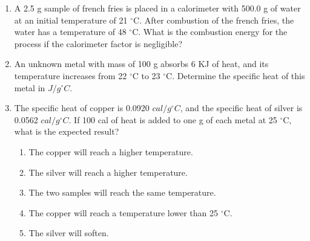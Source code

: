 \documentclass[main.tex]{subfiles}
\begin{document}
\begin{fullwidth}
\begin{multicols*}{2}
\begin{enumerate}
\item  A 2.5 g sample of french fries is placed in a calorimeter with 500.0 g of water at an initial temperature of 21 $^{\circ}$C.  After combustion of the french fries, the water has a temperature of 48 $^{\circ}$C.  What is the combustion energy for the process if the calorimeter factor is negligible?
\begin{enumerate}[label=(\alph*)]\vspace{-0.5cm}
\end{enumerate}\vspace{-0.5cm}

\item  An unknown metal with mass of 100 g absorbs 6 KJ of heat, and its temperature increases from 22 $^{\circ}$C to 23 $^{\circ}$C. Determine the specific heat of this metal in $J/g ^{\circ}C$.
\begin{enumerate}[label=(\alph*)]\vspace{-0.5cm}
\end{enumerate}\vspace{-0.5cm}

\item  The specific heat of copper is 0.0920 $cal/g ^{\circ}C$, and the specific heat of silver is 0.0562 $cal/g ^{\circ}C$.  If 100 cal of heat is added to one g of each metal at 25 $^{\circ}$C, what is the expected result?
\begin{enumerate}[label=(\alph*)]
\item The copper will reach a higher temperature.
\item The silver will reach a higher temperature.
\item The two samples will reach the same temperature.
\item The copper will reach a temperature lower than 25 $^{\circ}$C.
\item The silver will soften.
\end{enumerate}


\end{enumerate}
\end{multicols*}
\end{fullwidth}
\end{document}
